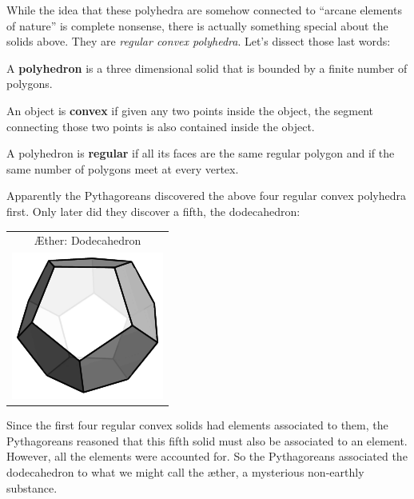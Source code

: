 \documentclass[noauthor,nooutcomes,hints,handout]{ximera}
\begin{document}
While the idea that these polyhedra are somehow connected to ``arcane
elements of nature'' is complete nonsense, there is actually something
special about the solids above. They are \textit{regular convex
  polyhedra}. Let's dissect those last words:

\begin{definition} 
A \textbf{polyhedron} is a three dimensional solid that is bounded by
a finite number of polygons.
\end{definition}

\begin{definition} 
An object is \textbf{convex} if given any two points inside the object,
the segment connecting those two points is also contained inside the
object.
\end{definition}

\begin{definition} 
A polyhedron is \textbf{regular} if all its faces are the same regular
polygon and if the same number of polygons meet at every vertex.
\end{definition}

Apparently the Pythagoreans discovered the above four regular convex
polyhedra first. Only later did they discover a fifth, the
dodecahedron:
\begin{center}
\begin{tabular}{|c|}
\hline
\AE ther: Dodecahedron\\
\includegraphics{dodecahedron.pdf} 
\\
\hline
\end{tabular}
\end{center}
Since the first four regular convex solids had elements associated to
them, the Pythagoreans reasoned that this fifth solid must also be
associated to an element. However, all the elements were accounted
for. So the Pythagoreans associated the dodecahedron to what we might
call the \ae ther, a mysterious non-earthly
substance.
\end{document}
